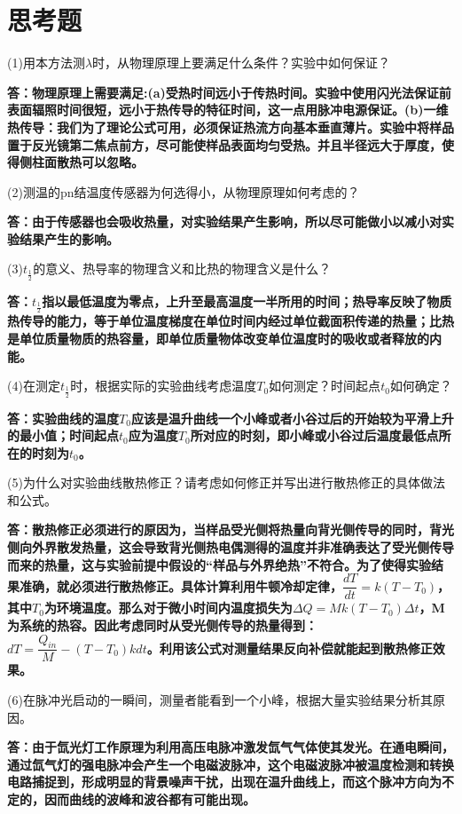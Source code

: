 \documentclass[UTF8]{ctexart}
\begin{document}
	\section{思考题}
	(1)用本方法测$\lambda$时，从物理原理上要满足什么条件？实验中如何保证？
	\par \textbf{答：物理原理上需要满足:(a)受热时间远小于传热时间。实验中使用闪光法保证前表面辐照时间很短，远小于热传导的特征时间，这一点用脉冲电源保证。(b)一维热传导：我们为了理论公式可用，必须保证热流方向基本垂直薄片。实验中将样品置于反光镜第二焦点前方，尽可能使样品表面均匀受热。并且半径远大于厚度，使得侧柱面散热可以忽略。}
	\par (2)测温的pn结温度传感器为何选得小，从物理原理如何考虑的？
	\par \textbf{答：由于传感器也会吸收热量，对实验结果产生影响，所以尽可能做小以减小对实验结果产生的影响。}
	\par (3)$t_{\frac{1}{2}}$的意义、热导率的物理含义和比热的物理含义是什么？
	\par \textbf{答：$t_{\frac{1}{2}}$指以最低温度为零点，上升至最高温度一半所用的时间；热导率反映了物质热传导的能力，等于单位温度梯度在单位时间内经过单位截面积传递的热量；比热是单位质量物质的热容量，即单位质量物体改变单位温度时的吸收或者释放的内能。}
	\par (4)在测定$t_{\frac{1}{2}}$时，根据实际的实验曲线考虑温度$T_{0}$如何测定？时间起点$t_{0}$如何确定？
	\par \textbf{答：实验曲线的温度$T_{0}$应该是温升曲线一个小峰或者小谷过后的开始较为平滑上升的最小值；时间起点$t_{0}$应为温度$T_{0}$所对应的时刻，即小峰或小谷过后温度最低点所在的时刻为$t_{0}$。}
	\par (5)为什么对实验曲线散热修正？请考虑如何修正并写出进行散热修正的具体做法和公式。
	\par \textbf{答：散热修正必须进行的原因为，当样品受光侧将热量向背光侧传导的同时，背光侧向外界散发热量，这会导致背光侧热电偶测得的温度并非准确表达了受光侧传导而来的热量，这与实验前提中假设的“样品与外界绝热”不符合。为了使得实验结果准确，就必须进行散热修正。具体计算利用牛顿冷却定律，$\dfrac{dT}{dt}=k(T-T_{0})$，其中$T_{0}$为环境温度。那么对于微小时间内温度损失为$\Delta Q=Mk(T-T_{0})\Delta t$，M为系统的热容。因此考虑同时从受光侧传导的热量得到：$dT=\dfrac{Q_{in}}{M}-(T-T_{0})kdt$。利用该公式对测量结果反向补偿就能起到散热修正效果。}
	\par (6)在脉冲光启动的一瞬间，测量者能看到一个小峰，根据大量实验结果分析其原因。
	\par \textbf{答：由于氙光灯工作原理为利用高压电脉冲激发氙气气体使其发光。在通电瞬间，通过氙气灯的强电脉冲会产生一个电磁波脉冲，这个电磁波脉冲被温度检测和转换电路捕捉到，形成明显的背景噪声干扰，出现在温升曲线上，而这个脉冲方向为不定的，因而曲线的波峰和波谷都有可能出现。}
\end{document}
